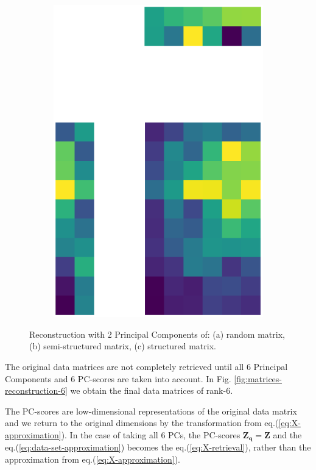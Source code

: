 \documentclass[10pt,twocolumn]{article}
\begin{document}
\begin{figure}[H]
\begin{subfigure}[t]{.15\textwidth}
\includegraphics[scale=.2]{DWGs/structured-matrix-reconstruction-PCs-2.eps}
\caption{ }
\end{subfigure}
\caption{Reconstruction with 2 Principal Components of: (a) random matrix, (b) semi-structured matrix, (c) structured matrix.}
\label{fig:matrices-reconstruction-2}
\end{figure}

The original data matrices are not completely retrieved until all 6 Principal Components and 6 PC-scores are taken into account. In Fig. \ref{fig:matrices-reconstruction-6} we obtain the final data matrices of rank-6.

The PC-scores are low-dimensional representations of the original data matrix and we return to the original dimensions by the transformation from eq.(\ref{eq:X-approximation}). In the case of taking all 6 PCs, the PC-scores $\bm{Z_q} = \bm{Z}$ and the eq.(\ref{eq:data-set-approximation}) becomes the eq.(\ref{eq:X-retrieval}), rather than the approximation from eq.(\ref{eq:X-approximation}).
\end{document}
